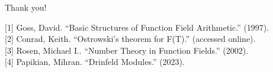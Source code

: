 \begin{frame}[fragile]{Thank you!}

 \footnotesize
    [1] Goss, David. “Basic Structures of Function Field Arithmetic.” (1997). \\
    
    [2] Conrad, Keith. ``Ostrowski's theorem for F(T).'' (accessed online).\\
    
    [3] Rosen, Michael I.. “Number Theory in Function Fields.” (2002).\\
  
    [4] Papikian, Mihran. “Drinfeld Modules.” (2023).

\end{frame}


